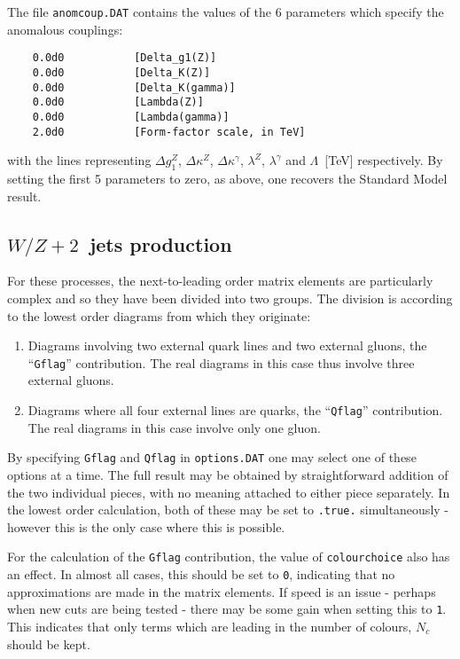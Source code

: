 \documentclass[12pt]{article}
\begin{document}
The file {\tt anomcoup.DAT} contains the values of the $6$ parameters
which specify the anomalous couplings:
\begin{verbatim}
    0.0d0           [Delta_g1(Z)]
    0.0d0           [Delta_K(Z)]
    0.0d0           [Delta_K(gamma)]
    0.0d0           [Lambda(Z)]
    0.0d0           [Lambda(gamma)]
    2.0d0           [Form-factor scale, in TeV]
\end{verbatim}
with the lines representing $\Delta g_1^Z$, $\Delta \kappa^Z$,
$\Delta \kappa^\gamma$, $\lambda^Z$, $\lambda^\gamma$ and
$\Lambda$~[TeV] respectively. By setting the first 5 parameters to zero,
as above, one recovers the Standard Model result.

\subsection{$W/Z+2$~jets production}

For these processes, the next-to-leading order matrix elements are
particularly complex and so they have been divided into two groups.
The division is according to the lowest order diagrams from which they
originate:
\begin{enumerate}
\item Diagrams involving two external quark lines and two external gluons,
the ``{\tt Gflag}'' contribution. The real diagrams in this case thus
involve three external gluons.

\item Diagrams where all four external lines are quarks,
the ``{\tt Qflag}'' contribution. The real diagrams in this case 
involve only one gluon.
\end{enumerate}

By specifying {\tt Gflag} and {\tt Qflag} in {\tt options.DAT} one may
select one of these options at a time. The full result may be obtained
by straightforward addition of the two individual pieces, with no
meaning attached to either piece separately. In the lowest order calculation,
both of these may be set to {\tt .true.} simultaneously - however this is
the only case where this is possible.

For the calculation of the {\tt Gflag} contribution, the value of
{\tt colourchoice} also has an effect. In almost all cases, this
should be set to {\tt 0}, indicating that no approximations are made in
the matrix elements. If speed is an issue - perhaps when new cuts are
being tested - there may be some gain when setting this to {\tt 1}.
This indicates that only terms which are leading in the number of colours,
$N_c$ should be kept. 
\end{document}
